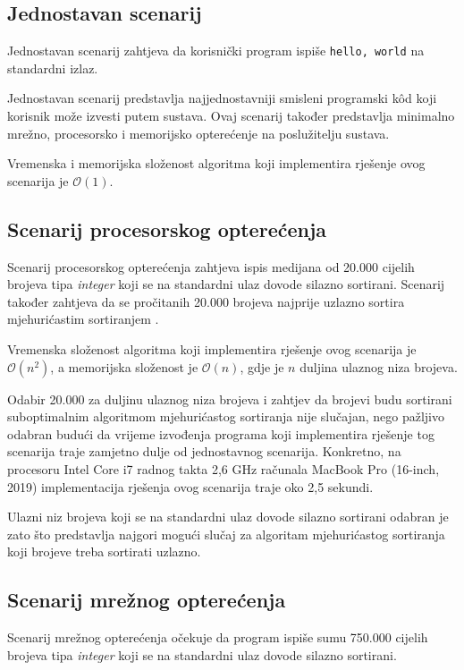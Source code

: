 \documentclass[times, utf8, diplomski]{fer}
\begin{document}
\subsection{Jednostavan scenarij}
Jednostavan scenarij zahtjeva da korisnički program ispiše \lstinline{hello, world} na standardni izlaz.

Jednostavan scenarij predstavlja najjednostavniji smisleni programski kôd koji korisnik može izvesti putem sustava. Ovaj scenarij također predstavlja minimalno mrežno, procesorsko i memorijsko opterećenje na poslužitelju sustava.

Vremenska i memorijska složenost algoritma koji implementira rješenje ovog scenarija je $\mathcal{O}(1)$.

\subsection{Scenarij procesorskog opterećenja}
Scenarij procesorskog opterećenja zahtjeva ispis medijana od 20.000 cijelih brojeva tipa \textit{integer} koji se na standardni ulaz dovode silazno sortirani. Scenarij također zahtjeva da se pročitanih 20.000 brojeva najprije uzlazno sortira mjehurićastim sortiranjem .

Vremenska složenost algoritma koji implementira rješenje ovog scenarija je $\mathcal{O}(n^2)$, a memorijska složenost je $\mathcal{O}(n)$, gdje je $n$ duljina ulaznog niza brojeva.

Odabir 20.000 za duljinu ulaznog niza brojeva i zahtjev da brojevi budu sortirani suboptimalnim algoritmom mjehurićastog sortiranja nije slučajan, nego pažljivo odabran budući da vrijeme izvođenja programa koji implementira rješenje tog scenarija traje zamjetno dulje od jednostavnog scenarija. Konkretno, na procesoru Intel Core i7 radnog takta 2,6 GHz računala MacBook Pro (16-inch, 2019)  implementacija rješenja ovog scenarija traje oko 2,5 sekundi.

Ulazni niz brojeva koji se na standardni ulaz dovode silazno sortirani odabran je zato što predstavlja najgori mogući slučaj  za algoritam mjehurićastog sortiranja koji brojeve treba sortirati uzlazno.

\subsection{Scenarij mrežnog opterećenja}
Scenarij mrežnog opterećenja očekuje da program ispiše sumu 750.000 cijelih brojeva tipa \textit{integer} koji se na standardni ulaz dovode silazno sortirani.
\end{document}
